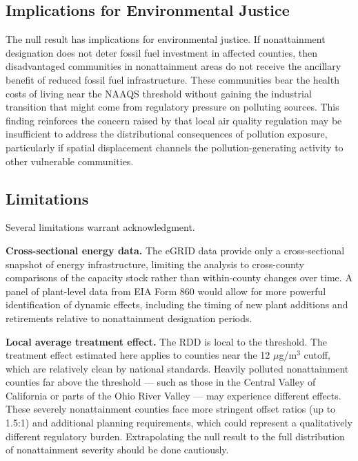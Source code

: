\documentclass[12pt]{article}
\begin{document}
\subsection{Implications for Environmental Justice}

The null result has implications for environmental justice. If nonattainment designation does not deter fossil fuel investment in affected counties, then disadvantaged communities in nonattainment areas do not receive the ancillary benefit of reduced fossil fuel infrastructure. These communities bear the health costs of living near the NAAQS threshold without gaining the industrial transition that might come from regulatory pressure on polluting sources. This finding reinforces the concern raised by \citet{bishop2023unilateral} that local air quality regulation may be insufficient to address the distributional consequences of pollution exposure, particularly if spatial displacement channels the pollution-generating activity to other vulnerable communities.

\subsection{Limitations}

Several limitations warrant acknowledgment.

\textbf{Cross-sectional energy data.} The eGRID data provide only a cross-sectional snapshot of energy infrastructure, limiting the analysis to cross-county comparisons of the capacity stock rather than within-county changes over time. A panel of plant-level data from EIA Form 860 would allow for more powerful identification of dynamic effects, including the timing of new plant additions and retirements relative to nonattainment designation periods.

\textbf{Local average treatment effect.} The RDD is local to the threshold. The treatment effect estimated here applies to counties near the 12 $\mu$g/m$^3$ cutoff, which are relatively clean by national standards. Heavily polluted nonattainment counties far above the threshold --- such as those in the Central Valley of California or parts of the Ohio River Valley --- may experience different effects. These severely nonattainment counties face more stringent offset ratios (up to 1.5:1) and additional planning requirements, which could represent a qualitatively different regulatory burden. Extrapolating the null result to the full distribution of nonattainment severity should be done cautiously.
\end{document}
